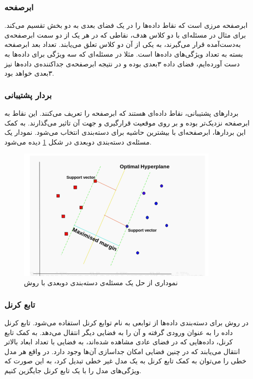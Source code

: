 \subsubsection{ابرصفحه}
ابرصفحه مرزی است که نقاط داده‌ها را در یک فضای بعدی به دو بخش تقسیم می‌کند. برای مثال در مسئله‌ای با دو کلاس هدف، نقاطی که در هر یک از دو سمت ابرصفحه‌ی به‌دست‌آمده قرار می‌گیرند، به یکی از آن دو کلاس تعلق می‌یابند. تعداد بعد ابرصفحه بسته به تعداد ویژگی‌های داده‌ها است. مثلا در مسئله‌ای که سه ویژگی برای داده‌ها به دست آورده‌ایم، فضای داده ۳بعدی بوده و در نتیجه ابرصفحه‌ی جداکننده‌ی داده‌ها نیز ۳بعدی خواهد بود.

\subsubsection{بردار پشتیبانی}
بردارهای پشتیبانی، نقاط داده‌ای هستند که ابرصفحه را تعریف می‌کنند. این نقاط به ابرصفحه نزدیک‌تر بوده و بر روی موقعیت قرارگیری و جهت آن تاثیر می‌گذارند. به کمک این بردارها، ابرصفحه‌ای با بیشترین حاشیه برای دسته‌بندی انتخاب می‌شود.\cite{SVM} نمودار یک مسئله‌ی دسته‌بندی دوبعدی در شکل \ref{fig:SVMClassification} دیده می‌شود.

\begin{figure}
\centering
\includegraphics[width=10cm]{Figures/svmMargin.png}
\caption{ نموداری از حل یک مسئله‌ی دسته‌بندی دوبعدی با روش \cite{SVM}}
\label{fig:SVMClassification}
\end{figure}
 

\subsubsection{ تابع کرنل}
در روش  برای دسته‌بندی داده‌ها از توابعی به نام توابع کرنل استفاده می‌شود. تابع کرنل داده را به عنوان ورودی گرفته و آن را به فضایی دیگر انتقال می‌دهد. به کمک تابع کرنل، داده‌هایی که در فضای عادی مشاهده شده‌اند، به فضایی با تعداد ابعاد بالاتر انتقال می‌یابند که در چنین فضایی امکان جداسازی آن‌ها وجود دارد. در واقع هر مدل خطی را می‌توان به کمک تابع کرنل به یک مدل غیر خطی تبدیل کرد، به این صورت که ویژگی‌های مدل را با یک تابع کرنل جایگزین کنیم. 

